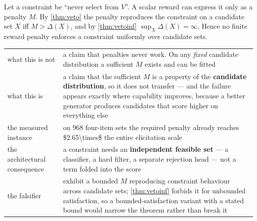\begin{corollary}
\label{cor:rewardmodel}
Let a constraint be ``never select from $V$''. A scalar reward can express it only
as a penalty $M$. By \cref{thm:veto} the penalty reproduces the constraint on a
candidate set $X$ iff $M > \Delta(X)$, and by \cref{thm:vetoinf}
$\sup_X\Delta(X)=\infty$. Hence no finite reward penalty enforces a
constraint uniformly over candidate sets.
\end{corollary}

\begin{table}[H]\centering\small
\begin{tabularx}{\textwidth}{P{3.2cm}Y}
\toprule
what this is not & a claim that penalties never work. On any \emph{fixed}
candidate distribution a sufficient $M$ exists and can be fitted\\
what this is & a claim that the sufficient $M$ is a property of the
\textbf{candidate distribution}, so it does not transfer --- and the failure
appears exactly where capability improves, because a better generator produces
candidates that score higher on everything else\\
the measured instance & on \num{968} four-item sets the required penalty already
reaches \num{$2.65\times$} the entire elicitation scale\\
the architectural consequence & a constraint needs an \textbf{independent
feasible set} --- a classifier, a hard filter, a separate rejection head --- not a
term folded into the score\\
the falsifier & exhibit a bounded $M$ reproducing constraint behaviour across
candidate sets; \cref{thm:vetoinf} forbids it for unbounded satisfaction, so a
bounded-satisfaction variant with a stated bound would narrow the theorem rather
than break it\\
\bottomrule
\end{tabularx}
\end{table}

